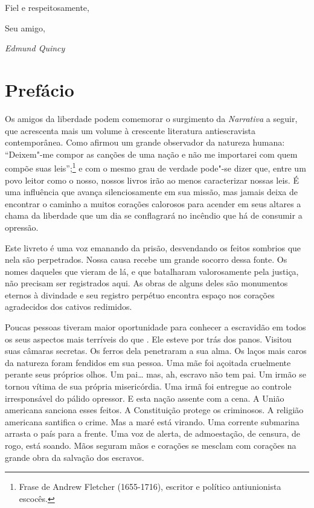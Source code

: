 Fiel e respeitosamente, 

Seu amigo,

\begin{flushright}
\emph{Edmund Quincy}
\end{flushright}

\chapter{Prefácio}

Os amigos da liberdade podem comemorar o surgimento da \emph{Narrativa} a
seguir, que acrescenta mais um volume à crescente literatura
antiescravista contemporânea. Como afirmou um grande observador da
natureza humana: ``Deixem"-me compor as canções de uma nação e não me
importarei com quem compõe suas leis'';\footnote{Frase de Andrew Fletcher
  (1655-1716), escritor e político antiunionista escocês.} e com o
mesmo grau de verdade pode"-se dizer que, entre um povo leitor como o
nosso, nossos livros irão ao menos caracterizar nossas leis. É uma
influência que avança silenciosamente em sua missão, mas jamais deixa de
encontrar o caminho a muitos corações calorosos para acender em seus
altares a chama da liberdade que um dia se conflagrará no incêndio que
há de consumir a opressão.

Este livreto é uma voz emanando da prisão, desvendando os feitos
sombrios que nela são perpetrados. Nossa causa recebe um grande socorro
dessa fonte. Os nomes daqueles que vieram de lá, e que batalharam
valorosamente pela justiça, não precisam ser registrados aqui. As obras
de alguns deles são monumentos eternos à divindade e seu registro
perpétuo encontra espaço nos corações agradecidos dos cativos redimidos.

Poucas pessoas tiveram maior oportunidade para conhecer a escravidão em
todos os seus aspectos mais terríveis do que . Ele
esteve por trás dos panos. Visitou suas câmaras secretas. Os ferros dela
penetraram a sua alma. Os laços mais caros da natureza foram fendidos em
sua pessoa. Uma mãe foi açoitada cruelmente perante seus próprios olhos.
Um pai\ldots{} mas, ah, escravo não tem pai. Um irmão se tornou vítima
de sua própria misericórdia. Uma irmã foi entregue ao controle
irresponsável do pálido opressor. E esta nação assente com a cena. A
União americana sanciona esses feitos. A Constituição protege os
criminosos. A religião americana santifica o crime. Mas a maré está
virando. Uma corrente submarina arrasta o país para a frente. Uma voz de
alerta, de admoestação, de censura, de rogo, está soando. Mãos seguram
mãos e corações se mesclam com corações na grande obra da salvação dos
escravos.

